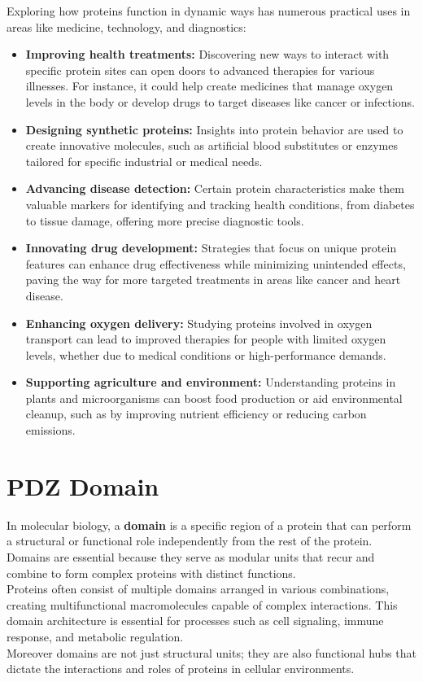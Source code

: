 \documentclass[English, Lau, oneside]{sapthesis}
\begin{document}
\noindent Exploring how proteins function in dynamic ways has numerous practical uses in areas like medicine, technology, and diagnostics:

\begin{itemize}
    \item \textbf{Improving health treatments:}  
    Discovering new ways to interact with specific protein sites can open doors to advanced therapies for various illnesses. For instance, it could help create medicines that manage oxygen levels in the body or develop drugs to target diseases like cancer or infections.

    \item \textbf{Designing synthetic proteins:}  
    Insights into protein behavior are used to create innovative molecules, such as artificial blood substitutes or enzymes tailored for specific industrial or medical needs.

    \item \textbf{Advancing disease detection:}  
    Certain protein characteristics make them valuable markers for identifying and tracking health conditions, from diabetes to tissue damage, offering more precise diagnostic tools.

    \item \textbf{Innovating drug development:}  
    Strategies that focus on unique protein features can enhance drug effectiveness while minimizing unintended effects, paving the way for more targeted treatments in areas like cancer and heart disease.

    \item \textbf{Enhancing oxygen delivery:}  
    Studying proteins involved in oxygen transport can lead to improved therapies for people with limited oxygen levels, whether due to medical conditions or high-performance demands.

    \item \textbf{Supporting agriculture and environment:}  
    Understanding proteins in plants and microorganisms can boost food production or aid environmental cleanup, such as by improving nutrient efficiency or reducing carbon emissions.
\end{itemize}
\newpage
\section{PDZ Domain}
\noindent 
In molecular biology, a \textbf{domain} is a specific region of a protein that can perform a structural or functional role independently from the rest of the protein.\cite{ref8} \\
Domains are essential because they serve as modular units that recur and combine to form complex proteins with distinct functions.\cite{ref8} \\
Proteins often consist of multiple domains arranged in various combinations, creating multifunctional macromolecules capable of complex interactions. This domain architecture is essential for processes such as cell signaling, immune response, and metabolic regulation.\\
Moreover domains are not just structural units; they are also functional hubs that dictate the interactions and roles of proteins in cellular environments. \cite{ref8}
\end{document}
